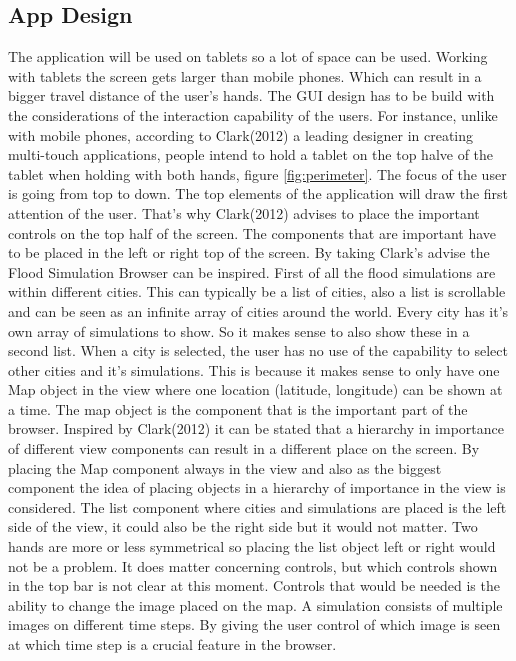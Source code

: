 \documentclass[10pt,a4paper]{article}
\begin{document}
\subsection{App Design}
The application will be used on tablets so a lot of space can be used. Working with tablets the screen gets larger than mobile phones. Which can result in a bigger travel distance of the user's hands. The GUI design has to be build with the considerations of the interaction capability of the users. For instance, unlike with mobile phones, according to Clark(2012) a leading designer in creating multi-touch applications, people intend to hold a tablet on the top halve of the tablet when holding with both hands, figure \ref{fig:perimeter}. The focus of the user is going from top to down. The top elements of the application will draw the first attention of the user. That's why Clark(2012) advises to place the important controls on the top half of the screen. The components that are important have to be placed in the left or right top of the screen. By taking Clark's advise the Flood Simulation Browser can be inspired. 
First of all the flood simulations are within different cities. This can typically be a list of cities, also a list is scrollable and can be seen as an infinite array of cities around the world. Every city has it's own array of simulations to show. So it makes sense to also show these in a second list. When a city is selected, the user has no use of the capability to select other cities and it's simulations. This is because it makes sense to only have one Map object in the view where one location (latitude, longitude) can be shown at a time. The map object is the component that is the important part of the browser. Inspired by Clark(2012) it can be stated that a hierarchy in importance of different view components can result in a different place on the screen. By placing the Map component always in the view and also as the biggest component the idea of placing objects in a hierarchy of importance in the view is considered.
The list component where cities and simulations are placed is the left side of the view, it could also be the right side but it would not matter. Two hands are more or less symmetrical so placing the list object left or right would not be a problem. It does matter concerning controls, but which controls shown in the top bar is not clear at this moment. Controls that would be needed is the ability to change the image placed on the map. A simulation consists of multiple images on different time steps. By giving the user control of which image is seen at which time step is a crucial feature in the browser. 
\end{document}
